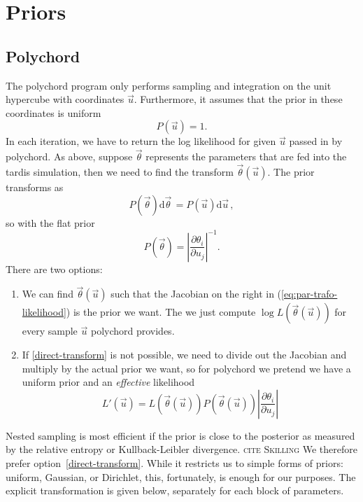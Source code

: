 \documentclass[a4,12pt]{article}
\newcommand{\rmdx}[1]{\mbox{d} #1 \,} %
\newcommand{\vecth}{\ensuremath{{\vec{\theta}}}}
\newcommand{\vecu}{\ensuremath{{\vec{u}}}}
\def \refeq#1{(\ref{eq:#1})}
\newcommand{\todo}[1]{{\textsc{\color{red}#1}}}
\begin{document}
\section{Priors}

\subsection{Polychord}

The polychord program only performs sampling and integration on the
unit hypercube with coordinates $\vecu$. Furthermore, it assumes that
the prior in these coordinates is uniform
\begin{equation}
  \label{eq:hypercube-prior}
  P(\vecu) = 1.
\end{equation}
In each iteration, we have to return the log likelihood for given
$\vecu$ passed in by polychord.  As above, suppose $\vecth$ represents
the parameters that are fed into the tardis simulation, then we need
to find the transform $\vecth(\vecu)$. The prior transforms as
\begin{equation}
  \label{eq:par-trafo}
  P(\vecth) \rmdx{\vecth} =  P(\vecu) \rmdx{\vecu},
\end{equation}
so with the flat prior
\begin{equation}
  \label{eq:par-trafo-likelihood}
  P(\vecth) = \left| \frac{\partial \theta_i}{\partial u_j} \right|^{-1} .
\end{equation}
There are two options:
\begin{enumerate}
\item \label{direct-transform} We can find $\vecth(\vecu)$ such that
  the Jacobian on the right in \refeq{par-trafo-likelihood} is the
  prior we want. The we just compute $\log L(\vecth(\vecu))$ for every
  sample $\vecu$ polychord provides.
\item If \ref{direct-transform} is not possible, we need to divide
  out the Jacobian and multiply by the actual prior we want, so for
  polychord we pretend we have a uniform prior and an \emph{effective} likelihood
  \begin{equation}
    \label{eq:eff-likelihood}
    L'(\vecu) = L(\vecth(\vecu)) P(\vecth(\vecu)) \left| \frac{\partial \theta_i}{\partial u_j} \right|
  \end{equation}
\end{enumerate}
Nested sampling is most efficient if the prior is close to the
posterior as measured by the relative entropy or Kullback-Leibler
divergence. \todo{cite Skilling} We therefore prefer
option~\ref{direct-transform}. While it restricts us to simple forms
of priors: uniform, Gaussian, or Dirichlet, this, fortunately, is
enough for our purposes. The explicit transformation is given below,
separately for each block of parameters.
\end{document}
